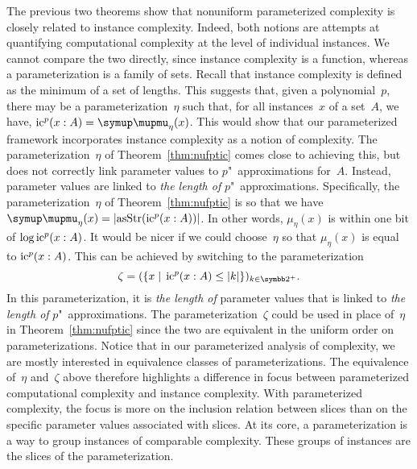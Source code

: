 The previous two theorems show that nonuniform parameterized complexity is closely related to instance complexity.
Indeed, both notions are attempts at quantifying computational complexity at the level of individual instances.
We cannot compare the two directly, since instance complexity is a function, whereas a parameterization is a family of sets.
Recall that instance complexity is defined as the minimum of a set of lengths.
This suggests that, given a polynomial~$p$, there may be a parameterization~$\eta$ such that, for all instances~$x$ of a set~$A$, we have, $\ic^p(x : A) = \mu_\eta(x)$.
This would show that our parameterized framework incorporates instance complexity as a notion of complexity.
The parameterization~$\eta$ of Theorem~\ref{thm:nufptic} comes close to achieving this, but does not correctly link parameter values to $p$"~approximations for~$A$.
Instead, parameter values are linked to \emph{the length of} $p$"~approximations.
Specifically, the parameterization~$\eta$ of Theorem~\ref{thm:nufptic} is so that we have $\mu_\eta(x) = \length{\asStr(\ic^p(x : A))}$.
In other words, $\mu_\eta(x)$ is within one bit of $\log \operatorname{ic}^p(x : A)$.
It would be nicer if we could choose~$\eta$ so that $\mu_\eta(x)$ is equal to $\operatorname{ic}^p(x : A)$.
This can be achieved by switching to the parameterization
\begin{equation*}
  \zeta \deq (\{x \st \ic^p(x : A) \le \length{k}\})_{k \in \binary^+}.
\end{equation*}
In this parameterization, it is \emph{the length of} parameter values that is linked to \emph{the length of} $p$"~approximations.
The parameterization~$\zeta$ could be used in place of~$\eta$ in Theorem~\ref{thm:nufptic} since the two are equivalent in the uniform order on parameterizations.
Notice that in our parameterized analysis of complexity, we are mostly interested in equivalence classes of parameterizations.
The equivalence of~$\eta$ and~$\zeta$ above therefore highlights a difference in focus between parameterized computational complexity and instance complexity.
With parameterized complexity, the focus is more on the inclusion relation between slices than on the specific parameter values associated with slices.
At its core, a parameterization is a way to group instances of comparable complexity.
These groups of instances are the slices of the parameterization.

